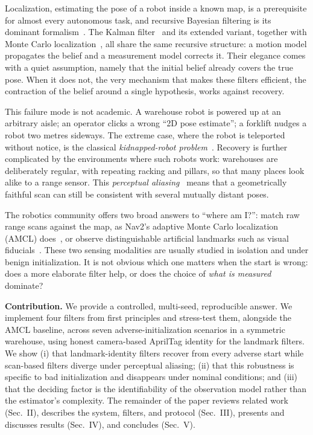 \documentclass[conference]{IEEEtran}
\begin{document}
Localization, estimating the pose of a robot inside a known map, is a prerequisite for almost every autonomous task, and recursive Bayesian filtering is its dominant formalism~\cite{Thrun2005}. The Kalman filter~\cite{Kalman1960} and its extended variant, together with Monte Carlo localization~\cite{Dellaert1999}, all share the same recursive structure: a motion model propagates the belief and a measurement model corrects it. Their elegance comes with a quiet assumption, namely that the initial belief already covers the true pose. When it does not, the very mechanism that makes these filters efficient, the contraction of the belief around a single hypothesis, works against recovery.

This failure mode is not academic. A warehouse robot is powered up at an arbitrary aisle; an operator clicks a wrong ``2D pose estimate''; a forklift nudges a robot two metres sideways. The extreme case, where the robot is teleported without notice, is the classical \emph{kidnapped-robot problem}~\cite{Thrun2005}. Recovery is further complicated by the environments where such robots work: warehouses are deliberately regular, with repeating racking and pillars, so that many places look alike to a range sensor. This \emph{perceptual aliasing}~\cite{Cummins2008,Lowry2016} means that a geometrically faithful scan can still be consistent with several mutually distant poses.

The robotics community offers two broad answers to ``where am I?'': match raw range scans against the map, as Nav2's adaptive Monte Carlo localization (AMCL) does~\cite{Macenski2023Nav2}, or observe distinguishable artificial landmarks such as visual fiducials~\cite{Olson2011}. These two sensing modalities are usually studied in isolation and under benign initialization. It is not obvious which one matters when the start is wrong: does a more elaborate filter help, or does the choice of \emph{what is measured} dominate?

\textbf{Contribution.} We provide a controlled, multi-seed, reproducible answer. We implement four filters from first principles and stress-test them, alongside the AMCL baseline, across seven adverse-initialization scenarios in a symmetric warehouse, using honest camera-based AprilTag identity for the landmark filters. We show (i) that landmark-identity filters recover from every adverse start while scan-based filters diverge under perceptual aliasing; (ii) that this robustness is specific to bad initialization and disappears under nominal conditions; and (iii) that the deciding factor is the identifiability of the observation model rather than the estimator's complexity. The remainder of the paper reviews related work (Sec.~II), describes the system, filters, and protocol (Sec.~III), presents and discusses results (Sec.~IV), and concludes (Sec.~V).
\end{document}
